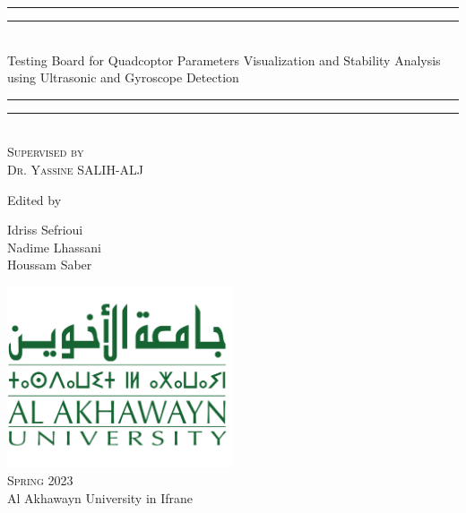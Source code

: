 \documentclass[12pt]{article}
\numberwithin{equation}{section}
\begin{document}
\begin{titlepage}


    \centering
    \vspace*{\baselineskip}
    \rule{\textwidth}{1.6pt}\vspace*{-\baselineskip}\vspace*{2pt}
    \rule{\textwidth}{0.4pt}\\[\baselineskip]
    {\LARGE Testing Board for Quadcoptor Parameters Visualization and Stability Analysis using Ultrasonic and Gyroscope Detection} 
    \rule{\textwidth}{0.4pt}\vspace*{-\baselineskip}\vspace{3.2pt}
    \rule{\textwidth}{1.6pt}\\[\baselineskip]
    \scshape
    Supervised by \\[\baselineskip] {\Large Dr. Yassine SALIH-ALJ}\par
    \vspace*{2\baselineskip}
    Edited by \\[\baselineskip]
    {\Large Idriss Sefrioui \\ Nadime Lhassani \\ Houssam Saber\par}
    \vfill
    \includegraphics[width=0.5\textwidth]{Figures/AUI.png}\\
    {\scshape Spring 2023} \\
    {\large Al Akhawayn University in Ifrane}\par
  \end{titlepage}


\newpage
\end{document}

